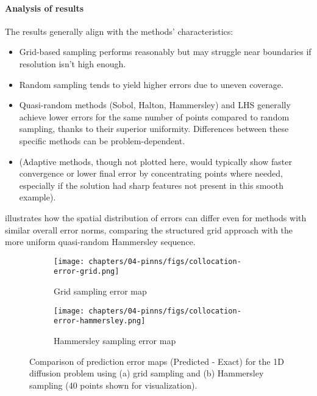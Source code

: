 \paragraph{Analysis of results}
The results generally align with the methods' characteristics:
\begin{itemize}
    \item Grid-based sampling performs reasonably but may struggle near boundaries if resolution isn't high enough.
    \item Random sampling tends to yield higher errors due to uneven coverage.
    \item Quasi-random methods (Sobol, Halton, Hammersley) and LHS generally achieve lower errors for the same number of points compared to random sampling, thanks to their superior uniformity. Differences between these specific methods can be problem-dependent.
    \item (Adaptive methods, though not plotted here, would typically show faster convergence or lower final error by concentrating points where needed, especially if the solution had sharp features not present in this smooth example).
\end{itemize}
 illustrates how the spatial distribution of errors can differ even for methods with similar overall error norms, comparing the structured grid approach with the more uniform quasi-random Hammersley sequence.

\begin{figure}[htbp] %
    \centering
    \begin{subfigure}[b]{0.48\textwidth}
         \centering
         \texttt{[image: chapters/04-pinns/figs/collocation-error-grid.png]}
         \caption{Grid sampling error map}
         \label{fig:grid-sampling-error} %
     \end{subfigure}
     \hfill
     \begin{subfigure}[b]{0.48\textwidth}
         \centering
         \texttt{[image: chapters/04-pinns/figs/collocation-error-hammersley.png]}
         \caption{Hammersley sampling error map}
         \label{fig:hammersley-sampling-error} %
     \end{subfigure}
    \caption{Comparison of prediction error maps (Predicted - Exact) for the 1D diffusion problem using (a) grid sampling and (b) Hammersley sampling (40 points shown for visualization).}
    \label{fig:collocation_error_maps} %
\end{figure}

